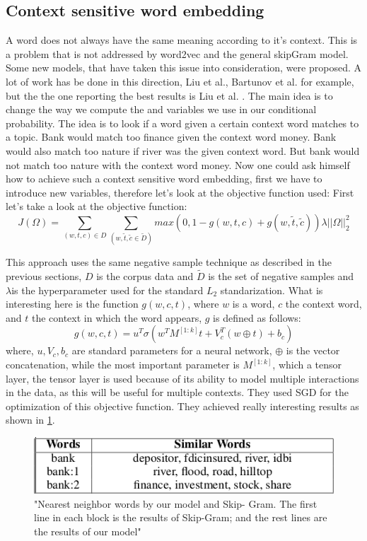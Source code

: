 \subsection{Context sensitive word embedding}
A word does not always have the same meaning according to it's context. This is a problem that is not addressed by word2vec and the general skipGram model. Some new models, that have taken this issue into consideration, were proposed. A lot of work has be done in this direction, Liu et al.\cite{topicalWE},  Bartunov et al.\cite{breaking} for example, but the the one reporting the best results is Liu et al. \cite{contextWithTensor}. The main idea is to change the way we compute the and variables we use in our conditional probability. The idea is to look if a word given a certain context word matches to a topic. Bank would match too finance given the context word money. Bank would also match too nature if river was the given context word. But bank would not match too nature with the context word money. Now one could ask himself how to achieve such a context sensitive word embedding, first we have to introduce new variables, therefore let's look at the objective function used: 
First let's take a look at the objective function:
\begin{equation}
J(\Omega) = \sum_{(w,t,c)\in D} \sum_{(w,\tilde{t},\tilde{c} \in{\tilde{D}})} max(0,1- g(w,t,c) + g(w,\tilde{t},\tilde{c})) \lambda||\Omega||_{2}^2
\end{equation}

This approach uses the same negative sample technique as described in the previous sections, $D$ is the corpus data and $\tilde{D}$ is the set of negative samples and $\lambda$is the hyperparameter used for the standard $L_2$ standarization. What is interesting here is the function $g(w,c,t)$, where $w$ is a word, $c$ the context word, and $t$ the context in which the word appears, $g$ is defined as follows: 
\begin{equation}
g(w,c,t) = u^T \sigma(w^TM^{[1:k]}t+V_c^T(w \oplus t) + b_c)
\end{equation}
where, $u, V_c, b_c$ are standard parameters for a neural network, $\oplus$ is the vector concatenation, while the most important parameter is $M^{[1:k]}$, which a tensor layer, the tensor layer is used because of its ability to model multiple interactions in the data, as this will be useful for multiple contexts. They used SGD for the optimization of this objective function.  They achieved really interesting results as shown in \ref{fig:multipleContext}.
\begin{figure}[ht]
    \centering
			\includegraphics[scale=0.7]{images/multipleContext.png} 
    \caption{"Nearest  neighbor  words  by  our  model  and  Skip-
Gram. The first line in each block is the results of Skip-Gram;
and the rest lines are the results of our model" \cite{contextWithTensor}}
    \label{fig:multipleContext}
\end{figure}



